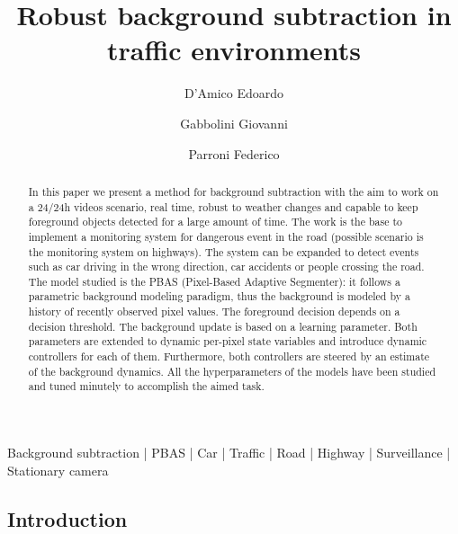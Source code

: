 
\title{Robust background subtraction in traffic environments}

\author[1 \space *]{D'Amico Edoardo}
\author[1 \space *]{Gabbolini Giovanni}
\author[1 \space *]{Parroni Federico}


\maketitle

\begin{abstract}
In this paper we present a method for background subtraction with the aim to work on a 24/24h videos scenario, real time, robust to weather changes and capable to keep foreground objects detected for a large amount of time. The work is the base to implement a monitoring system for dangerous event in the road (possible scenario is the monitoring system on highways). The system can be expanded to detect events such as car driving in the wrong direction, car accidents or people crossing the road.
The model studied is the PBAS (Pixel-Based Adaptive Segmenter): it follows a parametric background modeling paradigm, thus the background is modeled by a history of recently observed pixel
values. The foreground decision depends on a decision
threshold. The background update is based on a learning parameter. Both parameters are extended to dynamic per-pixel state variables and introduce dynamic controllers for each of them. Furthermore, both controllers are steered by an estimate of the background dynamics.
All the hyperparameters of the models have been studied and tuned minutely to accomplish the aimed task.
\end {abstract}

\begin{keywords}
    Background subtraction | PBAS | Car | Traffic | Road | Highway | Surveillance | Stationary camera
\end{keywords}


\subsection*{Introduction}


